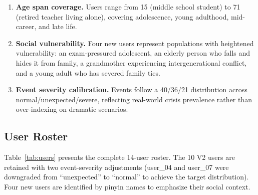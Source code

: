 \documentclass[11pt,a4paper]{article}
\begin{document}
\begin{enumerate}[leftmargin=*,itemsep=2pt]
  \item \textbf{Age span coverage.} Users range from 15 (middle school student)
    to 71 (retired teacher living alone), covering adolescence, young adulthood,
    mid-career, and late life.
  \item \textbf{Social vulnerability.} Four new users represent populations
    with heightened vulnerability: an exam-pressured adolescent, an elderly
    person who falls and hides it from family, a grandmother experiencing
    intergenerational conflict, and a young adult who has severed family ties.
  \item \textbf{Event severity calibration.} Events follow a 40/36/21
    distribution across normal/unexpected/severe, reflecting real-world
    crisis prevalence rather than over-indexing on dramatic scenarios.
\end{enumerate}

\subsection{User Roster}

Table~\ref{tab:users} presents the complete 14-user roster. The 10 V2 users
are retained with two event-severity adjustments (user\_04 and user\_07 were
downgraded from ``unexpected'' to ``normal'' to achieve the target
distribution). Four new users are identified by pinyin names to emphasize
their social context.
\end{document}
